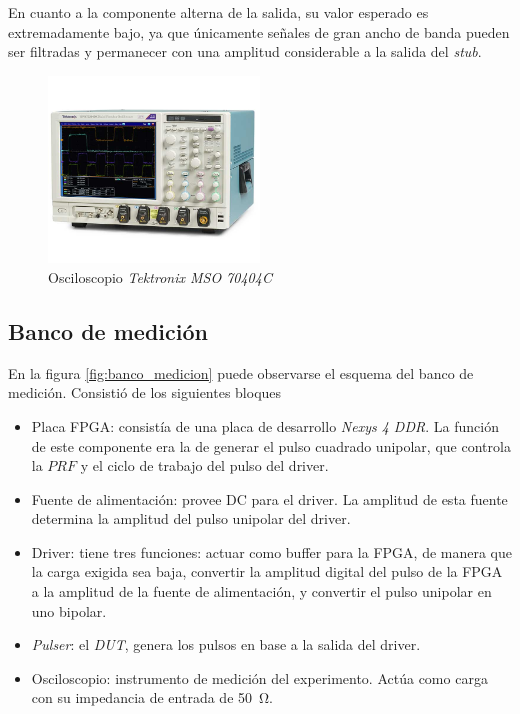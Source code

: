 En cuanto a la componente alterna de la salida, su valor esperado es
extremadamente bajo, ya que únicamente señales de gran ancho de banda pueden ser
filtradas y permanecer con una amplitud considerable a la salida del 
\textit{stub}.

\begin{figure}
  \centering
    \includegraphics[width=0.5\textwidth]{images/osciloscopio.png}
    \caption{Osciloscopio \textit{Tektronix MSO 70404C}}
    \label{fig:osciloscopio}
\end{figure}

\subsection{Banco de medición}

En la figura \ref{fig:banco_medicion} puede observarse el esquema del banco de
medición. Consistió de los siguientes bloques

\begin{itemize}
    \item Placa FPGA: consistía de una placa de desarrollo \textit{Nexys 4 DDR}.
      La función de este componente era la de generar el pulso cuadrado
      unipolar, que controla la $PRF$ y el ciclo de trabajo del pulso del driver.
    \item Fuente de alimentación: provee DC para el driver. La amplitud de esta
        fuente determina la amplitud del pulso unipolar del driver.
    \item Driver: tiene tres funciones: actuar como buffer para la FPGA, de
        manera que la carga exigida sea baja, convertir la amplitud digital del
        pulso de la FPGA a la amplitud de la fuente de alimentación, y convertir
        el pulso unipolar en uno bipolar.
    \item \textit{Pulser}: el \textit{DUT}, genera los pulsos en base a la salida del driver.
    \item Osciloscopio: instrumento de medición del experimento. Actúa como
      carga con su impedancia de entrada de \qty{50}{\ohm}.
\end{itemize}

